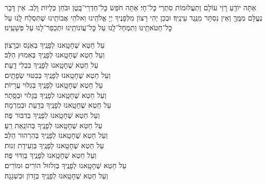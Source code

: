 \documentclass[twoside, openany, parskip=half, 11pt]{book}
\begin{document}
אַתָּה יוֹדֵֽעַ רָזֵי עוֹלָם וְתַעֲלוּמוֹת סִתְרֵי כׇּל־חָי׃ אַתָּה חֹפֵשׂ כׇּל־חַדְרֵי־בָֽטֶן וּבֹּחֵן כְּלָיוֹת וָלֵב. אֵין דָּבָר נֶעֱלָּם מִמֶּֽךָּ וְאֵין נִסְתָּר מִנֶּֽגֶד עֵינֶֽיךָ׃ וּבְכֵן יְהִי רָצוֹן מִלְּפָנֶיךָ יְיָ אֱלֹהֵֽינוּ וֵאלֹהֵי אֲבוֹתֵֽינוּ שֶׁתִּסְלַח לָֽנוּ עַל כׇּל־חַטֹּאתֵֽינוּ וְתִמְחַל־לָֽנוּ עַל כׇּל־עֲוֹנוֹתֵֽינוּ וּתְכַפֵר־לָנוּ עַל פְּשָׁעֵֽינוּ׃



עַל חֵטְא שֶׁחָטָֽאנוּ לְפָנֶֽיךָ בְּאֹֽנֵס וּבְרָצוֹן׃\\ וְעַל חֵטְא שֶׁחָטָֽאנוּ לְפָנֶֽיךָ בְּאִמוּץ הַלֵּב׃ \\
עַל חֵטְא שֶׁחָטָֽאנוּ לְפָנֶֽיךָ בִּבְלִי דָֽעַת׃ \\ וְעַל חֵטְא שֶׁחָטָֽאנוּ לְפָנֶֽיךָ בְּבִטּוּי שְׂפָתָֽיִם׃\\
עַל חֵטְא שֶׁחָטָֽאנוּ לְפָנֶֽיךָ בְּגִלּוּי עֲרָיוֹת׃ \\ וְעַל חֵטְא שֶׁחָטָֽאנוּ לְפָנֶֽיךָ בַּגָלוּי וּבַסָּֽתֶר׃ \\
עַל חֵטְא שֶׁחָטָֽאנוּ לְפָנֶֽיךָ בְּדַֽעַת וּבְמִרְמָה׃ \\ וְעַל חֵטְא שֶׁחָטָֽאנוּ לְפָנֶֽיךָ בְּדִבּוּר פֶּה׃ \\
עַל חֵטְא שֶׁחָטָֽאנוּ לְפָנֶֽיךָ בְּהוֹנָֽאַת רֵֽעַ׃ \\ וְעַל חֵטְא שֶׁחָטָֽאנוּ לְפָנֶֽיךָ בְּהִרְהוּר הַלֵּב׃ \\
עַל חֵטְא שֶׁחָטָֽאנוּ לְפָנֶֽיךָ בִּוְעִידַת זְנוּת׃\\ וְעַל חֵטְא שֶׁחָטָֽאנוּ לְפָנֶֽיךָ בְּוִדּוּי פֶּה׃ \\
עַל חֵטְא שֶׁחָטָֽאנוּ לְפָנֶֽיךָ בְּזִלזוּל הוֹרִים וּמוֹרִים׃ \\ וְעַל חֵטְא שֶׁחָטָֽאנוּ לְפָנֶֽיךָ  בְּזָדוֹן וּבִשְׁגָגָה׃\\
\end{document}
